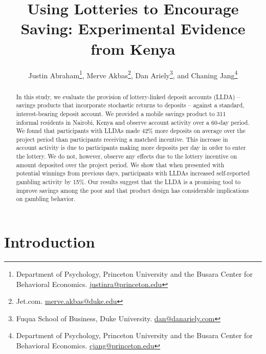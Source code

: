 \documentclass[12pt]{article}
\begin{document}
\title{Using Lotteries to Encourage Saving: Experimental Evidence from Kenya}

\author{Justin Abraham\thanks{Department of Psychology, Princeton University and the Busara Center for Behavioral Economics. \protect\href{mailto:justinra@princeton.edu}{justinra@princeton.edu}}, Merve Akbas\thanks{Jet.com. \protect\href{mailto:merve.akbas@duke.edu}{merve.akbas@duke.edu}}, Dan Ariely\thanks{Fuqua School of Business, Duke University. \protect\href{mailto:dan@danariely.com}{dan@danariely.com}}, and Chaning Jang\thanks{Department of Psychology, Princeton University and the Busara Center for Behavioral Economics. \protect\href{mailto:cjang@princeton.edu}{cjang@princeton.edu}}}

\maketitle

\begin{abstract}

	In this study, we evaluate the provision of lottery-linked deposit accounts (LLDA) -- savings products that incorporate stochastic returns to deposits -- against a standard, interest-bearing deposit account. We provided a mobile savings product to 311 informal residents in Nairobi, Kenya and observe account activity over a 60-day period. We found that participants with LLDAs made 42\% more deposits on average over the project period than participants receiving a matched incentive. This increase in account activity is due to participants making more deposits per day in order to enter the lottery. We do not, however, observe any effects due to the lottery incentive on amount deposited over the project period. We show that when presented with potential winnings from previous days, participants with LLDAs increased self-reported gambling activity by 15\%. Our results suggest that the LLDA is a promising tool to improve savings among the poor and that product design has considerable implications on gambling behavior.

\end{abstract}

\newpage

\section{Introduction}
\end{document}
